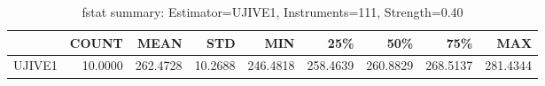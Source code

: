 \begin{table}[ht]
\centering
\caption{fstat summary: Estimator=UJIVE1, Instruments=111, Strength=0.40}
\begin{tabular}{lrrrrrrrr}
\toprule
 & COUNT & MEAN & STD & MIN & 25\% & 50\% & 75\% & MAX \\
\midrule
UJIVE1 & 10.0000 & 262.4728 & 10.2688 & 246.4818 & 258.4639 & 260.8829 & 268.5137 & 281.4344 \\
\bottomrule
\end{tabular}
\end{table}

